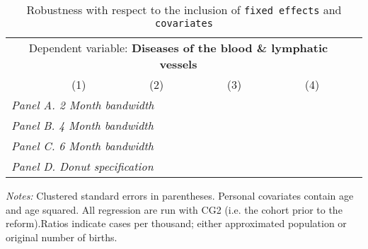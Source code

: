  \begin{table}[H] \begin{threeparttable} \centering \caption{Robustness with respect to the inclusion of \texttt{fixed effects} and \texttt{covariates}} {\def\sym#1{\ifmmode^{#1}\else\(^{#1}\)\fi} \begin{tabular}{l*{5}{c}} \toprule \multicolumn{5}{c}{Dependent variable: \textbf{Diseases of the blood \& lymphatic vessels}} \\ \cmidrule(lr){2-5}
            &\multicolumn{1}{c}{(1)}&\multicolumn{1}{c}{(2)}&\multicolumn{1}{c}{(3)}&\multicolumn{1}{c}{(4)}\\
\midrule
 \multicolumn{5}{l}{\emph{Panel A. 2 Month bandwidth}} \\    \midrule\multicolumn{5}{l}{\emph{Panel B. 4 Month bandwidth}} \\    \midrule\multicolumn{5}{l}{\emph{Panel C. 6 Month bandwidth}} \\    \midrule\multicolumn{5}{l}{\emph{Panel D. Donut specification}} \\    \midrule  
\bottomrule \end{tabular} } \begin{tablenotes} \item \scriptsize \emph{Notes:} Clustered standard errors in parentheses. Personal covariates contain age and age squared. All regression are run with CG2 (i.e. the cohort prior to the reform).Ratios indicate cases per thousand; either approximated population or original number of births. \end{tablenotes} \end{threeparttable} \end{table} 
